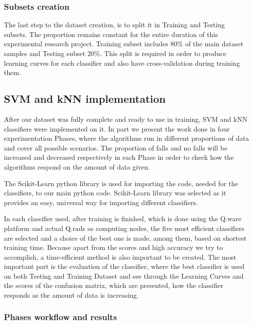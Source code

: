 \documentclass[10pt, conference, compsocconf]{IEEEtran}
\begin{document}
\subsubsection{Subsets creation}

The last step to the dataset creation, is to split it in Training and Testing subsets. The proportion remains constant for the entire duration of this experimental research project. Training subset includes 80\% of the main dataset samples and Testing subset 20\%. This split is required in order to produce learning curves for each classifier and also have cross-validation during training them.

\subsection{SVM and kNN implementation}

After our dataset was fully complete and ready to use in training, SVM and kNN classifiers were implemented on it. In part we present the work done in four experimentation Phases, where the algorithms run in different proportions of data and cover all possible scenarios. The proportion of falls and no falls will be increased and decreased respectively in each Phase in order to check how the algorithms respond on the amount of data given.

The Scikit-Learn python library is used for importing the code, needed for the classifiers, to our main python code. Scikit-Learn library was selected as it provides an easy, universal way for importing different classifiers. 

In each classifier used, after training is finished, which is done using the Q.ware platform and actual Q.rads as computing nodes, the five most efficient classifiers are selected and a choice of the best one is made, among them, based on shortest training time. Because apart from the scores and high accuracy we try to accomplish, a time-efficient method is also important to be created. The most important part is the evaluation of the classifier, where the best classifier is used on both Testing and Training Dataset and see through the Learning Curves and the scores of the confusion matrix, which are presented, how the classifier responds as the amount of data is increasing. 

\subsubsection{Phases workflow and results}
\end{document}

